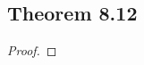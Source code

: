 \documentclass[../../main.tex]{subfiles}
\begin{document}
\subsection{Theorem 8.12}
\begin{wts}

\end{wts}
\begin{proof}

\end{proof}
\end{document}
